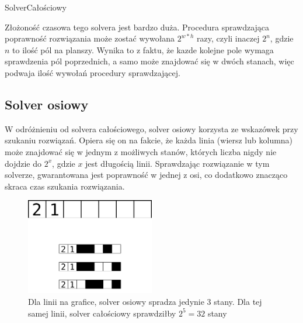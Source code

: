 \begin{pseudokod}[H]
    \caption{SolverCałościowy}\label{alg:allSolver}
\end{pseudokod}

    Złożoność czasowa tego solvera jest bardzo duża. Procedura sprawdzająca poprawność rozwiązania
może zostać wywołana $2^{w*h}$ razy, czyli inaczej $2^n$, gdzie $n$ to ilość pól na planszy. 
Wynika to z faktu, że kazde kolejne pole wymaga sprawdzenia pól poprzednich, a samo może znajdować
się w dwóch stanach, więc podwaja ilość wywołań procedury sprawdzającej.


\subsection{Solver osiowy}
    W odróżnieniu od solvera całościowego, solver osiowy korzysta ze wskazówek przy szukaniu rozwiązań.
Opiera się on na fakcie, że każda linia (wiersz lub kolumna) może znajdować się w jednym z możliwych
stanów, których liczba nigdy nie dojdzie do $2^x$, gdzie $x$ jest długością linii. Sprawdzając
rozwiązanie w tym solverze, gwarantowana jest poprawność w jednej z osi, co dodatkowo znacząco skraca
czas szukania rozwiązania.

\begin{figure}[!htb]
    \centering
    \includegraphics[width=0.5\textwidth]{images/axis_solver_example.png}
    \caption{Dla linii na grafice, solver osiowy spradza jedynie 3 stany. Dla tej samej linii,
solver całościowy sprawdziłby $2^5 = 32$ stany
    }
\end{figure}

